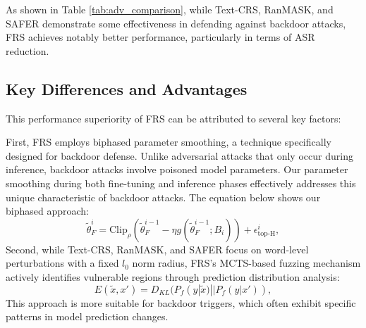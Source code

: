 \begin{table}[h]
\centering
\caption{Comparison with text adversarial attack defense methods under different attacks on SST-2.}
\label{tab:adv_comparison}
\end{table}
As shown in Table \ref{tab:adv_comparison}, while Text-CRS, RanMASK, and SAFER demonstrate some effectiveness in defending against backdoor attacks, FRS achieves notably better performance, particularly in terms of ASR reduction.

\subsection{Key Differences and Advantages}
This performance superiority of FRS can be attributed to several key factors:

First, FRS employs biphased parameter smoothing, a technique specifically designed for backdoor defense. Unlike adversarial attacks that only occur during inference, backdoor attacks involve poisoned model parameters. Our parameter smoothing during both fine-tuning and inference phases effectively addresses this unique characteristic of backdoor attacks. The equation below shows our biphased approach:
\begin{equation}
   \tilde{\theta}_F^i = \text{Clip}_\rho(\tilde{\theta}_F^{i-1} - \eta g(\tilde{\theta}_F^{i-1}; B_i)) + \epsilon^i_{\text{top-H}},
\end{equation}
Second, while Text-CRS, RanMASK, and SAFER focus on word-level perturbations with a fixed $l_0$ norm radius, FRS's MCTS-based fuzzing mechanism actively identifies vulnerable regions through prediction distribution analysis:
\begin{equation}
   E(\tilde{x},x') = D_{KL}(P_f(y|\tilde{x})||P_f(y|x')),
\end{equation}
This approach is more suitable for backdoor triggers, which often exhibit specific patterns in model prediction changes.

